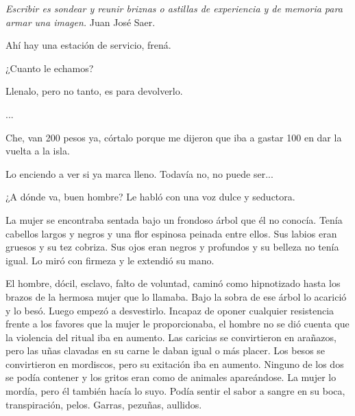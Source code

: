 \documentclass[12pt,twoside,openright,a5paper]{book}
\begin{document}
 \emph{Escribir es sondear y reunir briznas o
astillas de experiencia y de memoria para armar una imagen.} Juan José Saer.


\vspace{0.5cm}
\hrulefill\hspace{0.2cm} \decofourleft\decofourright \hspace{0.2cm} \hrulefill
\vspace{0.5cm}

Ahí hay una estación de servicio, frená.

¿Cuanto le echamos?

Llenalo, pero no tanto, es para devolverlo.

...

Che, van 200 pesos ya, córtalo porque me dijeron que iba a gastar 100 en
dar la vuelta a la isla.

Lo enciendo a ver si ya marca lleno. Todavía no,
no puede ser...


\vspace{0.5cm}
\hrulefill\hspace{0.2cm} \decofourleft\decofourright \hspace{0.2cm} \hrulefill
\vspace{0.5cm}

¿A dónde va, buen hombre? Le habló con una voz dulce y seductora.

La mujer se encontraba sentada bajo un frondoso árbol que él no
conocía. Tenía cabellos largos y negros y una flor espinosa peinada entre
ellos. Sus labios eran gruesos y su tez cobriza. Sus ojos eran negros y
profundos y su belleza no tenía igual. Lo miró con firmeza y le extendió
su mano.

El hombre, dócil, esclavo, falto de voluntad, caminó como hipnotizado hasta
los brazos de la hermosa mujer que lo llamaba. Bajo la sobra de ese árbol
lo acarició y lo besó. Luego empezó a desvestirlo. Incapaz de oponer
cualquier resistencia frente a los favores que la mujer le proporcionaba,
el hombre no se dió cuenta que la violencia del ritual iba en aumento. Las
caricias se convirtieron en arañazos, pero las uñas clavadas en su carne
le daban igual o más placer. Los besos se convirtieron en mordiscos, pero
su exitación iba en aumento. Ninguno de los dos se podía contener y
los gritos eran como de animales apareándose. La mujer lo mordía, pero
él también hacía lo suyo. Podía sentir el sabor a sangre en su boca,
transpiración, pelos. Garras, pezuñas, aullidos.
\end{document}
